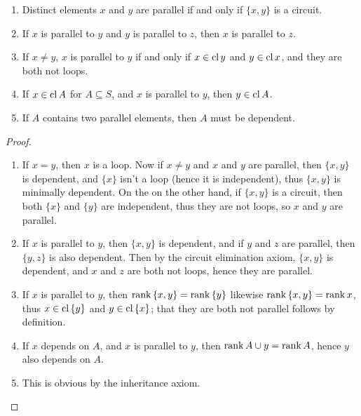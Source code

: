 \begin{proposition}\label{1.3.2}
    \begin{enumerate}[label=(\arabic*)]
        \item Distinct elements $x$ and  $y$ are parallel if and only if $\{x,y\}$ is a circuit.

        \item If $x$ is parallel to  $y$ and  $y$ is parallel to  $z$, then  $x$ is parallel to
            $z$.

        \item If $x \neq y$, $x$ is parallel to  $y$ if and only if  $x \in \operatorname{cl}{y}$ and $y \in
            \operatorname{cl}{x}$, and they are both not loops.

         \item If $x \in \operatorname{cl}{A}$ for $A \subseteq S$, and  $x$ is parallel to  $y$, then  $y \in \operatorname{cl}{A}$.

         \item If $A$ contains two parallel elements, then $A$ must be dependent.
    \end{enumerate}
\end{proposition}
\begin{proof}
    \begin{enumerate}[label=(\arabic*)]
        \item If $x=y$, then  $x$ is a loop. Now if  $x \neq y$ and  $x$ and  $y$ are parallel, then
            $\{x,y\}$ is dependent, and $\{x\}$ isn't a loop (hence it is independent), thus
            $\{x,y\}$ is minimally dependent. On the on the other hand, if $\{x,y\}$ is a circuit,
            then both $\{x\}$ and $\{y\}$ are independent, thus they are not loops, so $x$ and  $y$
            are parallel.

        \item If $x$ is parallel to  $y$, then  $\{x,y\}$ is dependent, and if $y$ and  $z$ are
            parallel, then  $\{y,z\}$ is also dependent. Then by the circuit elimination axiom,
            $\{x,y\}$ is dependent, and  $x$ and  $z$ are both not loops, hence they are parallel.

        \item If  $x$ is parallel to $y$, then  $\operatorname{rank}{\{x,y\}}=\operatorname{rank}{\{y\}}$ likewise
            $\operatorname{rank}{\{x,y\}=\operatorname{rank}{x}}$, thus $x \in \operatorname{cl}{\{y\}}$ and $y \in \operatorname{cl}{\{x\}}$; that they are
            both not parallel follows by definition.

        \item If $x$ depends on  $A$, and  $x$ is parallel to  $y$, then  $\operatorname{rank}{A \cup
            y}=\operatorname{rank}{A}$, hence $y$ also depends on $A$.

        \item This is obvious by the inheritance axiom.
    \end{enumerate}
\end{proof}
